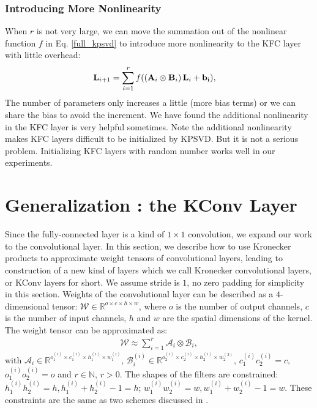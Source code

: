 \documentclass{article}
\def\A{{\bf A}}
\def\B{{\bf B}}
\def\L{{\bf L}}
\def\RB{{\mathbb R}}
\begin{document}
\subsubsection{Introducing More Nonlinearity}
When $r$ is not very large, we can move the summation out of the nonlinear function $f$ in Eq. \eqref{full_kpsvd} to introduce more nonlinearity to the KFC layer with little overhead:
\begin{align}
\begin{split}
\L_{i+1} & = \sum_{i=1}^{r} f(\left(\A_{i} \otimes \B_{i}\right) \L_{i} + \bf{b}_i),
\end{split}
\end{align}
The number of parameters only increases a little (more bias terms) or we can share the bias to avoid the increment. We have found the additional nonlinearity in the KFC layer  is very helpful sometimes.
Note the additional nonlinearity makes KFC layers difficult to be initialized by KPSVD. But it is not a serious problem. Initializing KFC layers with random number works well in our experiments.

\section{Generalization : the KConv Layer}
Since the fully-connected layer is a kind of $1\times 1$ convolution, we expand our work to the convolutional layer. In this section, we describe how to use Kronecker products to approximate weight tensors of convolutional layers, leading to construction of a new kind of layers which we call Kronecker convolutional layers, or KConv layers for short. We assume stride is $1$, no zero padding for simplicity in this section.
Weights of the convolutional layer can be described as a $4$-dimensional tensor: $\mathcal{W} \in \RB^{o\times c\times h \times w}$,
where $o$ is the number of output channels, $c$ is the number of input channels, $h$ and $w$ are the spatial dimensions of the kernel. The weight
tensor can be approximated as:
\begin{align}
\mathcal{W} \approx \sum_{i=1}^{r}\mathcal{A}_i\otimes\mathcal{B}_i,
\end{align}
with $\mathcal{A}_i \in \RB^{o_1^{(i)}\times c_1^{(i)}\times h_1^{(i)}\times w_1^{(i)}}$, $\mathcal{B}_i^{(i)} \in \RB^{o_2^{(i)}\times c_2^{(i)}\times h_2^{(i)}\times w_2^{(2)}}$, $c_1^{(i)}c_2^{(i)}=c$, $o_1^{(i)}o_2^{(i)}=o$ and $r \in \mathbb{N}$, $r > 0$. The shapes of the filters are constrained: $h_1^{(i)}h_2^{(i)}=h, h_1^{(i)}+h_2^{(i)}-1=h$;  $w_1^{(i)}w_2^{(i)}=w, w_1^{(i)}+w_2^{(i)}-1=w$. These constraints are the same as two schemes discussed in \cite{DBLP:conf/bmvc/JaderbergVZ14}.
\end{document}
